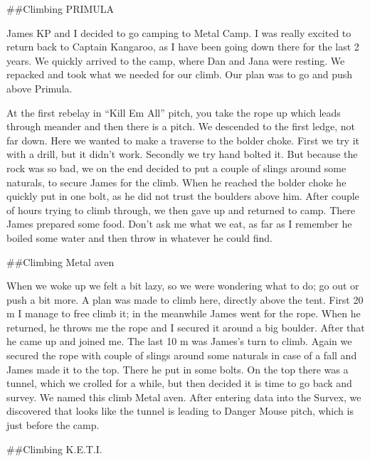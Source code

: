 \attrib{\izi}

\#\#Climbing PRIMULA

James KP and I decided to go camping to Metal Camp. I was really excited
to return back to Captain Kangaroo, as I have been going down there for
the last 2 years. We quickly arrived to the camp, where Dan and Jana
were resting. We repacked and took what we needed for our climb. Our
plan was to go and push above Primula.

At the first rebelay in ``Kill Em All'' pitch, you take the rope up
which leads through meander and then there is a pitch. We descended to
the first ledge, not far down. Here we wanted to make a traverse to the
bolder choke. First we try it with a drill, but it didn't work. Secondly
we try hand bolted it. But because the rock was so bad, we on the end
decided to put a couple of slings around some naturals, to secure James
for the climb. When he reached the bolder choke he quickly put in one
bolt, as he did not trust the boulders above him. After couple of hours
trying to climb through, we then gave up and returned to camp. There
James prepared some food. Don't ask me what we eat, as far as I remember
he boiled some water and then throw in whatever he could find.

\attrib{\izi}

\#\#Climbing Metal aven

When we woke up we felt a bit lazy, so we were wondering what to do; go
out or push a bit more. A plan was made to climb here, directly above
the tent. First 20 m I manage to free climb it; in the meanwhile James
went for the rope. When he returned, he throws me the rope and I secured
it around a big boulder. After that he came up and joined me. The last
10 m was James's turn to climb. Again we secured the rope with couple of
slings around some naturals in case of a fall and James made it to the
top. There he put in some bolts. On the top there was a tunnel, which we
crolled for a while, but then decided it is time to go back and survey.
We named this climb Metal aven. After entering data into the Survex, we
discovered that looks like the tunnel is leading to Danger Mouse pitch,
which is just before the camp.

\attrib{\izi}

\#\#Climbing K.E.T.I.

